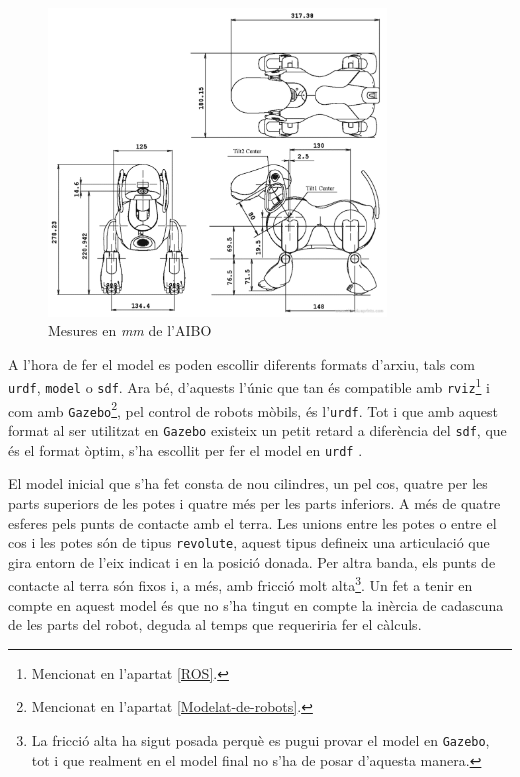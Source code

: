 \documentclass[12pt,a4paper,final,twoside]{article}
\begin{document}
\begin{figure}[tb]
\centering
\includegraphics[width=0.8\textwidth]{Imatges/aibo-4.pdf}
\caption{Mesures en \textit{mm} de l'AIBO \cite{Blueprint}}
\label{fig:mesures-aibo-model}
\end{figure}

A l'hora de fer el model es poden escollir diferents formats d'arxiu, tals com \texttt{urdf}, \texttt{model} o \texttt{sdf}. Ara bé, d'aquests l'únic que tan és compatible amb \texttt{rviz}\footnote{Mencionat en l'apartat \ref{ROS}.} i com amb \texttt{Gazebo}\footnote{Mencionat en l'apartat \ref{Modelat-de-robots}.}, pel control de robots mòbils, és l'\texttt{urdf}. Tot i que amb aquest format al ser utilitzat en \texttt{Gazebo} existeix un petit retard a diferència del \texttt{sdf}, que és el format òptim, s'ha escollit per fer el model en \texttt{urdf} \cite{Sucan}.

El model inicial que s'ha fet consta de nou cilindres, un pel cos, quatre per les parts superiors de les potes i quatre més per les parts inferiors. A més de quatre esferes pels punts de contacte amb el terra. Les unions entre les potes o entre el cos i les potes són de tipus \texttt{revolute}, aquest tipus defineix una articulació que gira entorn de l'eix indicat i en la posició donada. Per altra banda, els punts de contacte al terra són fixos i, a més, amb fricció molt alta\footnote{La fricció alta ha sigut posada perquè es pugui provar el model en \texttt{Gazebo}, tot i que realment en el model final no s'ha de posar d'aquesta manera.}. Un fet a tenir en compte en aquest model és que no s'ha tingut en compte la inèrcia de cadascuna de les parts del robot, deguda al temps que requeriria fer el càlculs. 
\end{document}
